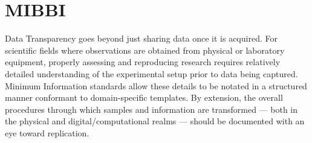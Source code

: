 
\section{MIBBI}\fbeg{}\begin{frame}{}


\begin{ftxt}

Data Transparency goes beyond just sharing data once it is acquired.  
For scientific fields where observations are 
obtained from physical or laboratory equipment, properly 
assessing and reproducing research requires relatively 
detailed understanding of the experimental 
setup prior to data being captured.  Minimum Information 
standards allow these details to be notated 
in a structured manner conformant to domain-specific templates.
By extension, the overall procedures through which samples 
and information are transformed --- both in 
the physical and digital/computational realms --- should be 
documented with an eye toward replication.

\end{ftxt}

\end{frame}

